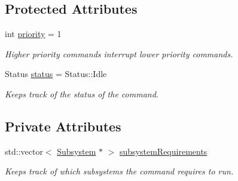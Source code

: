\subsection*{Protected Attributes}
\begin{DoxyCompactItemize}
\item 
\mbox{\label{classlib_iterative_robot_1_1_command_af2fd312376da33f5eba582db90389511}} 
int \mbox{\hyperlink{classlib_iterative_robot_1_1_command_af2fd312376da33f5eba582db90389511}{priority}} = 1
\begin{DoxyCompactList}\small\item\em Higher priority commands interrupt lower priority commands. \end{DoxyCompactList}\item 
\mbox{\label{classlib_iterative_robot_1_1_command_a54548a957a6b4097837c41fcc660467e}} 
Status \mbox{\hyperlink{classlib_iterative_robot_1_1_command_a54548a957a6b4097837c41fcc660467e}{status}} = Status\+::\+Idle
\begin{DoxyCompactList}\small\item\em Keeps track of the status of the command. \end{DoxyCompactList}\end{DoxyCompactItemize}
\subsection*{Private Attributes}
\begin{DoxyCompactItemize}
\item 
std\+::vector$<$ \mbox{\hyperlink{classlib_iterative_robot_1_1_subsystem}{Subsystem}} $\ast$ $>$ \mbox{\hyperlink{classlib_iterative_robot_1_1_command_abbedf025246921d5cde67aa954b74d35}{subsystem\+Requirements}}
\begin{DoxyCompactList}\small\item\em Keeps track of which subsystems the command requires to run. \end{DoxyCompactList}\end{DoxyCompactItemize}

